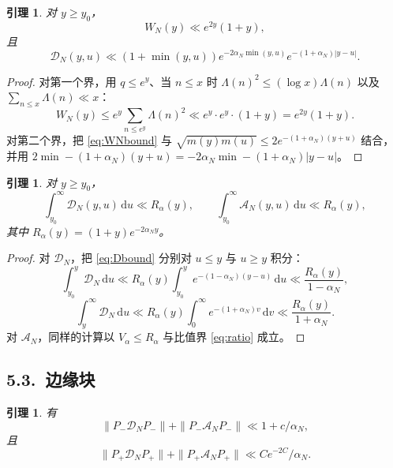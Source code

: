 \documentclass[12pt,a4paper]{amsart}
\numberwithin{equation}{section}
\theoremstyle{plain}
\newtheorem{lemma}[theorem]{引理}
\theoremstyle{definition}
\newcommand{\dd}{\,\mathrm{d}}
\begin{document}
\begin{lemma}\label{lem:row}
对 $y\ge y_0$，
\begin{equation}\label{eq:WNbound}
 W_N(y)\ll e^{2y}(1+y),
\end{equation}
且
\begin{equation}\label{eq:Dbound}
 \mathscr D_N(y,u)\ll(1+\min(y,u))e^{-2\alpha_N\min(y,u)}
 e^{-(1+\alpha_N)|y-u|}.
\end{equation}
\end{lemma}

\begin{proof}
对第一个界，用 $q\le e^y$、当 $n\le x$ 时 $\Lambda(n)^2\le(\log x)\Lambda(n)$
以及 $\sum_{n\le x}\Lambda(n)\ll x$：
\[
 W_N(y)\le e^y\sum_{n\le e^y}\Lambda(n)^2
 \ll e^y\cdot e^y\cdot(1+y)=e^{2y}(1+y).
\]
对第二个界，把 \eqref{eq:WNbound} 与
$\sqrt{m(y)m(u)}\le2e^{-(1+\alpha_N)(y+u)}$ 结合，并用
$2\min-(1+\alpha_N)(y+u)=-2\alpha_N\min-(1+\alpha_N)|y-u|$。
\end{proof}

\begin{lemma}\label{lem:rows}
对 $y\ge y_0$，
\begin{equation}\label{eq:rowD}
 \int_{y_0}^{\infty}\mathscr D_N(y,u)\dd u\ll R_\alpha(y),
 \qquad
 \int_{y_0}^{\infty}\mathscr A_N(y,u)\dd u\ll R_\alpha(y),
\end{equation}
其中 $R_\alpha(y)=(1+y)e^{-2\alpha_Ny}$。
\end{lemma}

\begin{proof}
对 $\mathscr D_N$，把 \eqref{eq:Dbound} 分别对 $u\le y$ 与 $u\ge y$ 积分：
\[
 \int_{y_0}^{y}\mathscr D_N\dd u\ll R_\alpha(y)\int_{y_0}^{y}
 e^{-(1-\alpha_N)(y-u)}\dd u\ll\frac{R_\alpha(y)}{1-\alpha_N},
\]
\[
 \int_{y}^{\infty}\mathscr D_N\dd u\ll R_\alpha(y)
 \int_0^{\infty}e^{-(1+\alpha_N)v}\dd v\ll\frac{R_\alpha(y)}{1+\alpha_N}.
\]
对 $\mathscr A_N$，同样的计算以 $V_\alpha\le R_\alpha$ 与比值界 \eqref{eq:ratio}
成立。
\end{proof}

\subsection*{5.3.\ 边缘块}

\begin{lemma}\label{lem:edge}
有
\begin{equation}\label{eq:low}
 \|P_-\mathcal D_NP_-\|+\|P_-\mathscr A_NP_-\|\ll1+c/\alpha_N,
\end{equation}
且
\begin{equation}\label{eq:high}
 \|P_+\mathcal D_NP_+\|+\|P_+\mathscr A_NP_+\|\ll Ce^{-2C}/\alpha_N .
\end{equation}
\end{lemma}
\end{document}
